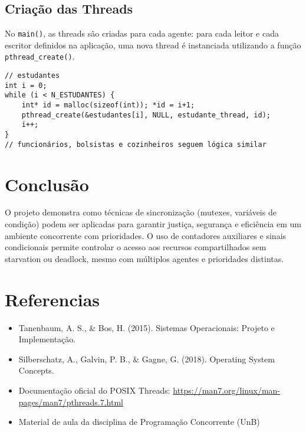 \documentclass[10pt,a4paper]{article}
\begin{document}
\subsection{Criação das Threads}

No \texttt{main()}, as threads são criadas para cada agente: para cada leitor e cada escritor definidos na aplicação, uma nova thread é instanciada utilizando a função \texttt{pthread_create()}. 

\begin{verbatim}
// estudantes
int i = 0;
while (i < N_ESTUDANTES) {
    int* id = malloc(sizeof(int)); *id = i+1;
    pthread_create(&estudantes[i], NULL, estudante_thread, id);
    i++;
}
// funcionários, bolsistas e cozinheiros seguem lógica similar
\end{verbatim}

\section{Conclusão}

O projeto demonstra como técnicas de sincronização (mutexes, variáveis de condição) podem ser aplicadas para garantir justiça, segurança e eficiência em um ambiente concorrente com prioridades. O uso de contadores auxiliares e sinais condicionais permite controlar o acesso aos recursos compartilhados sem starvation ou deadlock, mesmo com múltiplos agentes e prioridades distintas.

\section{Referencias}

\begin{itemize}
    \item Tanenbaum, A. S., \& Bos, H. (2015). Sistemas Operacionais: Projeto e Implementação.
    \item Silberschatz, A., Galvin, P. B., \& Gagne, G. (2018). Operating System Concepts.
    \item Documentação oficial do POSIX Threads: \url{https://man7.org/linux/man-pages/man7/pthreads.7.html}
    \item Material de aula da disciplina de Programação Concorrente (UnB)
\end{itemize}
\end{document}

